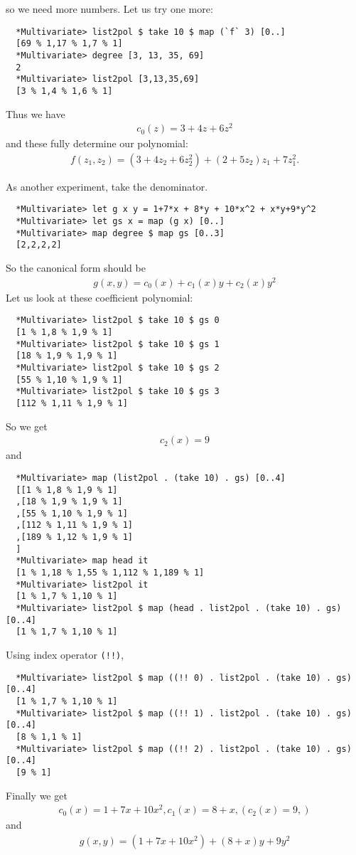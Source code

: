 \documentclass[11pt]{book}
\begin{document}
so we need more numbers.
Let us try one more:
\begin{verbatim}
  *Multivariate> list2pol $ take 10 $ map (`f` 3) [0..]
  [69 % 1,17 % 1,7 % 1]
  *Multivariate> degree [3, 13, 35, 69]
  2
  *Multivariate> list2pol [3,13,35,69]
  [3 % 1,4 % 1,6 % 1]
\end{verbatim}
Thus we have
\begin{eqnarray}
c_0(z) = 3+4z+6z^2
\end{eqnarray}
and these fully determine our polynomial:
\begin{eqnarray}
f(z_1, z_2) = (3+4z_2+6z_2^2) + (2 + 5z_2)z_1 + 7z_1^2.
\end{eqnarray}

As another experiment, take the denominator.
\begin{verbatim}
  *Multivariate> let g x y = 1+7*x + 8*y + 10*x^2 + x*y+9*y^2
  *Multivariate> let gs x = map (g x) [0..]
  *Multivariate> map degree $ map gs [0..3] 
  [2,2,2,2]
\end{verbatim}
So the canonical form should be
\begin{eqnarray}
g(x,y) = c_0(x) + c_1(x)y + c_2(x)y^2
\end{eqnarray}
Let us look at these coefficient polynomial:
\begin{verbatim}
  *Multivariate> list2pol $ take 10 $ gs 0
  [1 % 1,8 % 1,9 % 1]
  *Multivariate> list2pol $ take 10 $ gs 1
  [18 % 1,9 % 1,9 % 1]
  *Multivariate> list2pol $ take 10 $ gs 2
  [55 % 1,10 % 1,9 % 1]
  *Multivariate> list2pol $ take 10 $ gs 3
  [112 % 1,11 % 1,9 % 1]
\end{verbatim}
So we get
\begin{eqnarray}
c_2(x) = 9
\end{eqnarray}
and 
\begin{verbatim}  
  *Multivariate> map (list2pol . (take 10) . gs) [0..4] 
  [[1 % 1,8 % 1,9 % 1]
  ,[18 % 1,9 % 1,9 % 1]
  ,[55 % 1,10 % 1,9 % 1]
  ,[112 % 1,11 % 1,9 % 1]
  ,[189 % 1,12 % 1,9 % 1]
  ]
  *Multivariate> map head it
  [1 % 1,18 % 1,55 % 1,112 % 1,189 % 1]
  *Multivariate> list2pol it
  [1 % 1,7 % 1,10 % 1]
  *Multivariate> list2pol $ map (head . list2pol . (take 10) . gs) [0..4] 
  [1 % 1,7 % 1,10 % 1]
\end{verbatim}
Using index operator \texttt{(!!)},
\begin{verbatim}
  *Multivariate> list2pol $ map ((!! 0) . list2pol . (take 10) . gs) [0..4] 
  [1 % 1,7 % 1,10 % 1]
  *Multivariate> list2pol $ map ((!! 1) . list2pol . (take 10) . gs) [0..4] 
  [8 % 1,1 % 1]
  *Multivariate> list2pol $ map ((!! 2) . list2pol . (take 10) . gs) [0..4] 
  [9 % 1]
\end{verbatim}
Finally we get
\begin{eqnarray}
c_0(x) = 1 + 7x+10x^2, c_1(x) = 8+x, \left( c_2(x) = 9, \right)
\end{eqnarray}
and
\begin{eqnarray}
g(x,y) = (1+7x+10x^2) + (8+x)y + 9y^2
\end{eqnarray}
\end{document}
